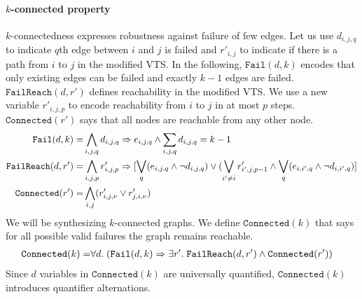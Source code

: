 \paragraph{$k$-connected property}
%
$k$-connectedness expresses robustness against failure of few edges.
%
Let us use $d_{i,j,q}$ to indicate $q$th edge between $i$ and $j$ is failed
and $r'_{i,j}$ to indicate if there is a path from $i$ to $j$ in
the modified VTS.
%
%
In the following, $\texttt{Fail}(d,k)$ encodes that only
existing edges can be failed and exactly $k-1$ edges are failed.
%
$\texttt{FailReach}(d,r')$ defines reachability in the modified VTS.
%
We use a new variable $r'_{i,j,p}$ to encode reachability from
$i$ to $j$ in at most $p$ steps.
%
$\texttt{Connected}(r')$ says that all nodes are reachable from any
other node.
\begin{align*}
  \texttt{Fail}(d,k) = & 
  \bigwedge\limits_{i,j,q} d_{i,j,q} \Rightarrow e_{i,j,q}  \land 
  \sum_{i,j,q} d_{i,j,q} = k-1\\
  \texttt{FailReach}(d,r') = &
   \bigwedge\limits_{i,j,p}  r^{\prime}_{i,j,p} \Rightarrow [\bigvee_{q} (e_{i,j,q} \land  \neg d_{i,j,q}) \lor  (\bigvee_{i' \neq i}  r^{\prime}_{i',j,p-1} \land  \bigvee_{q} (e_{i,i',q} \land \neg d_{i,i',q}) ]\\
  \texttt{Connected}(r') = & \bigwedge\limits_{i,j} (r^{\prime}_{i,j,\nu} \lor r^{\prime}_{j,i,\nu})
\end{align*}
We will be synthesizing $k$-connected graphs.
%
We define $\texttt{Connected}(k)$ that says for all possible valid failures
the graph remains reachable. 
\begin{align*}
  \texttt{Connected}(k) = & \forall d.\;
          (\texttt{Fail}(d,k) \Rightarrow \exists r'.\;\texttt{FailReach}(d,r')
                                \land \texttt{Connected}(r'))
\end{align*}
Since $d$ variables in $\texttt{Connected}(k)$ are universally
quantified, $\texttt{Connected}(k)$ introduces quantifier alternations.
%




